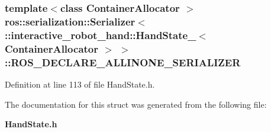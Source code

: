 \subsubsection[{R\-O\-S\-\_\-\-D\-E\-C\-L\-A\-R\-E\-\_\-\-A\-L\-L\-I\-N\-O\-N\-E\-\_\-\-S\-E\-R\-I\-A\-L\-I\-Z\-E\-R}]{\setlength{\rightskip}{0pt plus 5cm}template$<$class Container\-Allocator $>$ ros\-::serialization\-::\-Serializer$<$ \-::{\bf interactive\-\_\-robot\-\_\-hand\-::\-Hand\-State\-\_\-}$<$ Container\-Allocator $>$ $>$\-::R\-O\-S\-\_\-\-D\-E\-C\-L\-A\-R\-E\-\_\-\-A\-L\-L\-I\-N\-O\-N\-E\-\_\-\-S\-E\-R\-I\-A\-L\-I\-Z\-E\-R}\label{structros_1_1serialization_1_1Serializer_3_01_1_1interactive__robot__hand_1_1HandState___3_01ContainerAllocator_01_4_01_4_a0841b1a8cd80a79d88c6193417d1772a}


Definition at line 113 of file Hand\-State.\-h.



The documentation for this struct was generated from the following file\-:\begin{DoxyCompactItemize}
\item 
{\bf Hand\-State.\-h}\end{DoxyCompactItemize}
